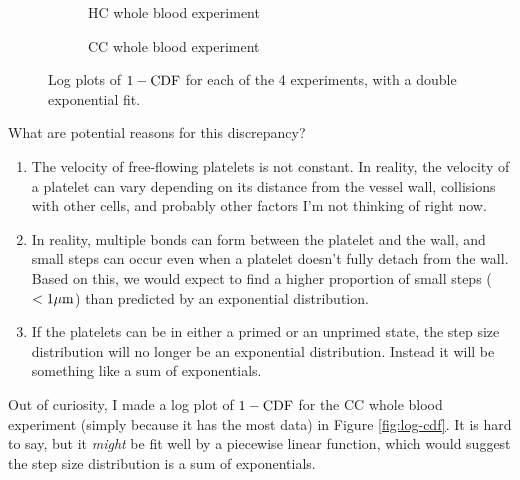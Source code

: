 \documentclass{article}
\newcommand{\tn}{\textnormal}
\begin{document}
\begin{figure}
\begin{subfigure}{0.48\textwidth}
    \caption{HC whole blood experiment}
    \label{fig:log-cdf-hcwhole}
  \end{subfigure}
  \hfill
  \begin{subfigure}{0.48\textwidth}
    \caption{CC whole blood experiment}
    \label{fig:log-cdf-ccwhole}
  \end{subfigure}
  \caption{Log plots of $1 - \tn{CDF}$ for each of the 4 experiments,
    with a double exponential fit.}
  \label{fig:semilogy-cdf}
\end{figure}

What are potential reasons for this discrepancy?
\begin{enumerate}
\item The velocity of free-flowing platelets is not constant. In
  reality, the velocity of a platelet can vary depending on its
  distance from the vessel wall, collisions with other cells, and
  probably other factors I'm not thinking of right now.
\item In reality, multiple bonds can form between the platelet and the
  wall, and small steps can occur even when a platelet doesn't fully
  detach from the wall. Based on this, we would expect to find a
  higher proportion of small steps ($< 1 \mu\tn{m}$) than predicted by
  an exponential distribution.
\item If the platelets can be in either a primed or an unprimed state,
  the step size distribution will no longer be an exponential
  distribution. Instead it will be something like a sum of
  exponentials.
\end{enumerate}

Out of curiosity, I made a log plot of $1 - \tn{CDF}$ for the CC whole
blood experiment (simply because it has the most data) in Figure
\ref{fig:log-cdf}. It is hard to say, but it \emph{might} be fit well
by a piecewise linear function, which would suggest the step size
distribution is a sum of exponentials.
\end{document}
